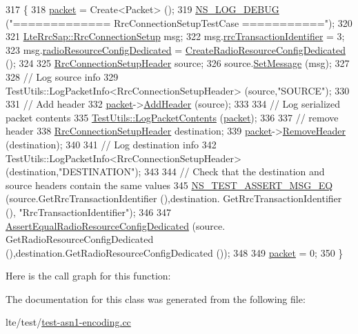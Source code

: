 \begin{DoxyCode}
317 \{
318   \hyperlink{classRrcHeaderTestCase_a6f0748c0e845f797497fbda1ca781803}{packet} = Create<Packet> ();
319   \hyperlink{group__logging_ga413f1886406d49f59a6a0a89b77b4d0a}{NS\_LOG\_DEBUG} (\textcolor{stringliteral}{"============= RrcConnectionSetupTestCase ==========="});
320 
321   \hyperlink{structns3_1_1LteRrcSap_1_1RrcConnectionSetup}{LteRrcSap::RrcConnectionSetup} msg;
322   msg.\hyperlink{structns3_1_1LteRrcSap_1_1RrcConnectionSetup_a40e8a5a2d7f65d0fed6f4950ea9781c2}{rrcTransactionIdentifier} = 3;
323   msg.\hyperlink{structns3_1_1LteRrcSap_1_1RrcConnectionSetup_a6ef4a38c3ecafdb970726ac8b63393a1}{radioResourceConfigDedicated} = 
      \hyperlink{classRrcHeaderTestCase_a078175e25caaedb4ef308b54e76db7b4}{CreateRadioResourceConfigDedicated} ();
324 
325   \hyperlink{classns3_1_1RrcConnectionSetupHeader}{RrcConnectionSetupHeader} source;
326   source.\hyperlink{classns3_1_1RrcConnectionSetupHeader_a03b2064f067cbb6756004a5252460c3b}{SetMessage} (msg);
327 
328   \textcolor{comment}{// Log source info}
329   TestUtils::LogPacketInfo<RrcConnectionSetupHeader> (source,\textcolor{stringliteral}{"SOURCE"});
330 
331   \textcolor{comment}{// Add header}
332   \hyperlink{classRrcHeaderTestCase_a6f0748c0e845f797497fbda1ca781803}{packet}->\hyperlink{classns3_1_1Packet_a465108c595a0bc592095cbcab1832ed8}{AddHeader} (source);
333 
334   \textcolor{comment}{// Log serialized packet contents}
335   \hyperlink{classTestUtils_a9391dac3282094e6e57c0052d88a086f}{TestUtils::LogPacketContents} (\hyperlink{classRrcHeaderTestCase_a6f0748c0e845f797497fbda1ca781803}{packet});
336 
337   \textcolor{comment}{// remove header}
338   \hyperlink{classns3_1_1RrcConnectionSetupHeader}{RrcConnectionSetupHeader} destination;
339   \hyperlink{classRrcHeaderTestCase_a6f0748c0e845f797497fbda1ca781803}{packet}->\hyperlink{classns3_1_1Packet_a0961eccf975d75f902d40956c93ba63e}{RemoveHeader} (destination);
340 
341   \textcolor{comment}{// Log destination info}
342   TestUtils::LogPacketInfo<RrcConnectionSetupHeader> (destination,\textcolor{stringliteral}{"DESTINATION"});
343 
344   \textcolor{comment}{// Check that the destination and source headers contain the same values}
345   \hyperlink{group__testing_ga2a9d78cffb3db8e867c35fff0b698cf5}{NS\_TEST\_ASSERT\_MSG\_EQ} (source.GetRrcTransactionIdentifier (),destination.
      GetRrcTransactionIdentifier (), \textcolor{stringliteral}{"RrcTransactionIdentifier"});
346 
347   \hyperlink{classRrcHeaderTestCase_ab6230c6987acd58d7482ca5e40b80875}{AssertEqualRadioResourceConfigDedicated} (source.
      GetRadioResourceConfigDedicated (),destination.GetRadioResourceConfigDedicated ());
348 
349   \hyperlink{classRrcHeaderTestCase_a6f0748c0e845f797497fbda1ca781803}{packet} = 0;
350 \}
\end{DoxyCode}


Here is the call graph for this function\+:




The documentation for this class was generated from the following file\+:\begin{DoxyCompactItemize}
\item 
lte/test/\hyperlink{test-asn1-encoding_8cc}{test-\/asn1-\/encoding.\+cc}\end{DoxyCompactItemize}
